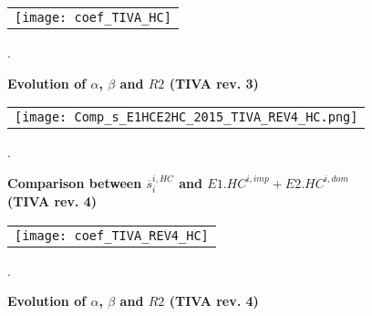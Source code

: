 \documentclass[11pt,a4paper]{article} %
\begin{document}
\begin{figure}[H]
	\centering
	\caption{\footnotesize{\textbf{Evolution of $\alpha$, $\beta$ and $R2$ (TIVA rev. 3)}}}
	\begin{tabular}{c}
		\texttt{[image: coef\_TIVA\_HC]}\\
	\end{tabular}
	\label{fig:evolution_coef_TiVA}
	.
\end{figure}

\begin{figure}[H]
	\centering
	\caption{\footnotesize{\textbf{Comparison between $\overline{s}_{i}^{i,HC}$ and $E1.HC^{i,imp}+E2.HC^{i,dom}$ (TIVA rev. 4)}}}
	\begin{tabular}{c}
		\texttt{[image: Comp\_s\_E1HCE2HC\_2015\_TIVA\_REV4\_HC.png]}\\
	\end{tabular}
	\label{fig:ratiodir_TiVA_REV4}
	.
\end{figure}

\begin{figure}[H]
	\centering
	\caption{\footnotesize{\textbf{Evolution of $\alpha$, $\beta$ and $R2$ (TIVA rev. 4)}}}
	\begin{tabular}{c}
		\texttt{[image: coef\_TIVA\_REV4\_HC]}\\
	\end{tabular}
	\label{fig:evolution_coef_TiVA_REV4}
	.
\end{figure}


\newpage
\end{document}
